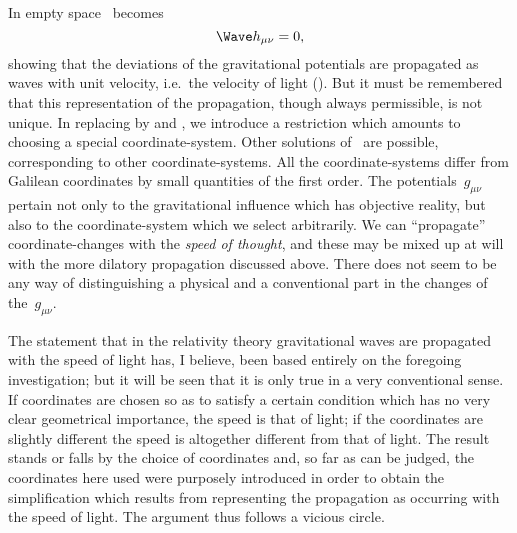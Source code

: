 \documentclass[12pt]{book}
\begin{document}
In empty space ~becomes
\[
\Wave h_{\mu\nu} = 0,
\]
showing that the deviations of the gravitational potentials are propagated
as waves with unit velocity, i.e.\ the velocity of light (). But it must be
%
remembered that this representation of the propagation, though always permissible,
%
is not unique. In replacing  by  and , we introduce
a restriction which amounts to choosing a special coordinate-system. Other
solutions of~ are possible, corresponding to other coordinate-systems.
All the coordinate-systems differ from Galilean coordinates by small quantities
of the first order. The potentials~$g_{\mu\nu}$ pertain not only to the gravitational
influence which has objective reality, but also to the coordinate-system which
we select arbitrarily. We can ``propagate'' coordinate-changes with the
\emph{speed of thought}, and these may be mixed up at will with the more dilatory
propagation discussed above. There does not seem to be any way of distinguishing
a physical and a conventional part in the changes of the~$g_{\mu\nu}$.

The statement that in the relativity theory gravitational waves are propagated
with the speed of light has, I believe, been based entirely on the
foregoing investigation; but it will be seen that it is only true in a very
conventional sense. If coordinates are chosen so as to satisfy a certain condition
which has no very clear geometrical importance, the speed is that of
light; if the coordinates are slightly different the speed is altogether different
from that of light. The result stands or falls by the choice of coordinates and,
so far as can be judged, the coordinates here used were purposely introduced
in order to obtain the simplification which results from representing the
propagation as occurring with the speed of light. The argument thus follows
a vicious circle.
\end{document}
